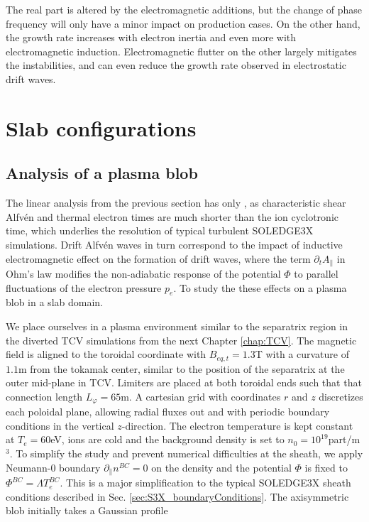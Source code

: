 The real part is altered by the electromagnetic additions, but the change of phase frequency will only have a minor impact on production cases. On the other hand, the growth rate increases with electron inertia and even more with electromagnetic induction. Electromagnetic flutter on the other largely mitigates the instabilities, and can even reduce the growth rate observed in electrostatic drift waves.



\section{Slab configurations}
\subsection{Analysis of a plasma blob}
\label{ssec:plasmablob}

The linear analysis from the previous section has only , as characteristic shear Alfvén and thermal electron times are much shorter than the ion cyclotronic time, which underlies the resolution of typical turbulent SOLEDGE3X simulations. Drift Alfvén waves in turn correspond to the impact of inductive electromagnetic effect on the formation of drift waves, where the term $\partial_t A_\parallel$ in Ohm's law modifies the non-adiabatic response of the potential $\Phi$ to parallel fluctuations of the electron pressure $p_e$. To study the these effects on a plasma blob in a slab domain. \newline

We place ourselves in a plasma environment similar to the separatrix region in the diverted TCV simulations from the next Chapter \ref{chap:TCV}. The magnetic field is aligned to the toroidal coordinate with $B_{eq,t} = 1.3$T with a curvature of $1.1$m from the tokamak center, similar to the position of the separatrix at the outer mid-plane in TCV. Limiters are placed at both toroidal ends such that that connection length $L_\varphi = 65$m. A cartesian grid with coordinates $r$ and $z$ discretizes each poloidal plane, allowing radial fluxes out and with periodic boundary conditions in the vertical $z$-direction. The electron temperature is kept constant at $T_e=60$eV, ions are cold and the background density is set to $n_0 = 10^{19}$part/m$^3$. To simplify the study and prevent numerical difficulties at the sheath, we apply Neumann-0 boundary $\partial_\parallel n^{BC} = 0$ on the density and the potential $\Phi$ is fixed to $\Phi^{BC} = \Lambda T_e^{BC}$. This is a major simplification to the typical SOLEDGE3X sheath conditions described in Sec. \ref{sec:S3X_boundaryConditions}. The axisymmetric blob initially takes a Gaussian profile 

